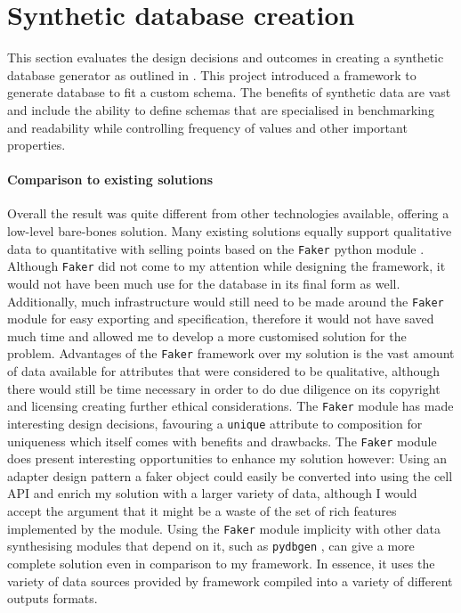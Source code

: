 \section{Synthetic database creation}
This section evaluates the design decisions and outcomes in creating a synthetic
database generator as outlined in . This
project introduced a framework to generate database to fit a custom schema. The
benefits of synthetic data are vast and include the ability to define schemas
that are specialised in benchmarking and readability while controlling frequency
of values and other important properties.

\paragraph{Comparison to existing solutions} Overall the result was quite different from other technologies available,
offering a low-level bare-bones solution. Many existing solutions equally support
qualitative data to quantitative with selling points based on the
\lstinline{Faker} python module \cite{Faker}. Although \lstinline{Faker} did not come to my
attention while designing the framework, it would not have been much use for the
 database in its final form as well. Additionally, much
infrastructure would still need to be made around the \lstinline{Faker} module
for easy exporting and specification, therefore it would not have saved much
time and allowed me to develop a more customised solution for the problem.
Advantages of the \lstinline{Faker} framework over my solution is the vast
amount of data available for attributes that were considered to be qualitative,
although there would still be time necessary in order to do due diligence on its
copyright and licensing creating further ethical considerations. The \lstinline{Faker} module has made interesting
design decisions, favouring a \lstinline{unique} attribute to composition for
uniqueness which itself comes with benefits and drawbacks. The \lstinline{Faker}
module does present interesting opportunities to enhance my solution however:
Using an adapter design pattern a faker object could easily be converted into
using the cell API and enrich my solution with a larger variety of data,
although I would accept the argument that it might be a waste of the set of rich
features implemented by the module. Using the \lstinline{Faker} module implicity
with other data synthesising modules that depend on
it, such as \lstinline{pydbgen} \cite{pydbgen}, can give a more complete solution even in
comparison to my framework. In essence, it uses the variety of data sources
provided by framework compiled into a variety of different outputs formats.

